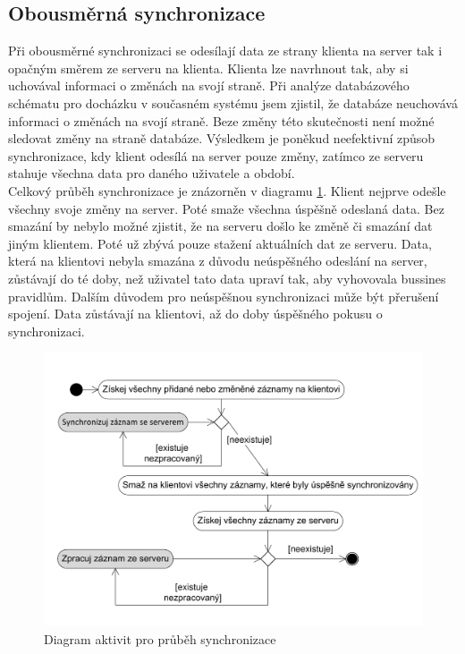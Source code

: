 \documentclass{diplomka}
\begin{document}
\subsection{Obousměrná synchronizace}
Při obousměrné synchronizaci se odesílají data ze strany klienta na server tak i opačným směrem ze serveru na klienta. Klienta lze navrhnout tak, aby si uchovával informaci o změnách na svojí straně. Při analýze databázového schématu pro docházku v současném systému jsem zjistil, že databáze neuchovává informaci o změnách na svojí straně. Beze změny této skutečnosti není možné sledovat změny na straně databáze. Výsledkem je poněkud neefektivní způsob synchronizace, kdy klient odesílá na server pouze změny, zatímco ze serveru stahuje všechna data pro daného uživatele a období.
\\ \indent
Celkový průběh synchronizace je znázorněn v diagramu \ref{fig:sync}. Klient nejprve odešle všechny svoje změny na server. Poté smaže všechna úspěšně odeslaná data. Bez smazání by nebylo možné zjistit, že na serveru došlo ke změně či smazání dat jiným klientem. Poté už zbývá pouze stažení aktuálních dat ze serveru. Data, která na klientovi nebyla smazána z důvodu neúspěšného odeslání na server, zůstávají do té doby, než uživatel tato data upraví tak, aby vyhovovala bussines pravidlům. Dalším důvodem pro neúspěšnou synchronizaci může být přerušení spojení. Data zůstávají na klientovi, až do doby úspěšného pokusu o synchronizaci.
\begin{figure}[H]
  \centering
  \includegraphics[scale=0.7]{visio/sync.pdf}
\caption{Diagram aktivit pro průběh synchronizace}
\label{fig:sync}
\end{figure}
\end{document}
